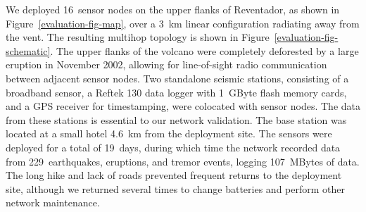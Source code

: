 We deployed 16~sensor nodes on the upper flanks of Reventador, as shown in
Figure~\ref{evaluation-fig-map}, over a 3~km linear configuration radiating
away from the vent. The resulting multihop topology is shown in
Figure~\ref{evaluation-fig-schematic}. The upper flanks of the volcano were
completely deforested by a large eruption in November 2002, allowing for
line-of-sight radio communication between adjacent sensor nodes.  Two
standalone seismic stations, consisting of a broadband sensor, a Reftek 130
data logger with 1~GByte flash memory cards, and a GPS receiver for
timestamping, were colocated with sensor nodes. The data from these stations
is essential to our network validation.
The base station was located at a small hotel 4.6~km from the deployment
site.  The sensors were deployed for a total of 19~days, during which time
the network recorded data from 229~earthquakes, eruptions, and tremor events,
logging 107~MBytes of data. The long hike and lack of roads prevented
frequent returns to the deployment site, although we returned several times
to change batteries and perform other network maintenance.



%
%
%

